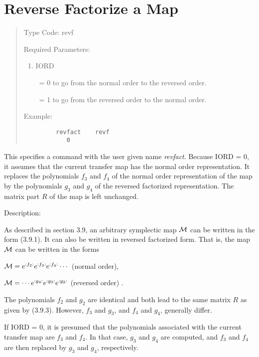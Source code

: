 \section{Reverse Factorize a Map}
\begin{quotation}
\noindent Type Code:  revf 
\vspace{5mm}

\noindent Required Parameters:
\begin{enumerate}
      \item  IORD

             \ = 0 to go from the normal \Mary order to the reversed order.

             \ = 1 to go from the reversed order to the normal \Mary order.
\end{enumerate}

\vspace{5mm}
\noindent Example:
\begin{verbatim}
         revfact    revf
            0
\end{verbatim}
\end{quotation}
This specifies a command with the user given name {\em revfact}.  Because IORD =
0, it assumes that the current transfer map has the normal \Mary order
representation.  It replaces the polynomials $f_3$  and $f_4$  of the normal
\Mary order representation of the map by the polynomials $g_3$  and $g_4$  of the
reversed factorized representation.  The matrix part $R$ of the map is left
unchanged.

\vspace{5mm}
     Description:
\vspace{2mm}

As described in section 3.9, an arbitrary symplectic map ${\cal M}$ can be
written in the form (3.9.1).  It can also be written in reversed
factorized form.  That is, the map ${\cal M}$ can be written in the forms
\begin{center}
${\cal M} = e^{:f_2:} e^{:f_3:} e^{:f_4:} \cdots$ (normal \Mary order),
\end{center}
\begin{center}
${\cal M} = \cdots e^{:g_4:} e^{:g_3:} e^{:g_2:}$ (reversed order) .
\end{center}
The polynomials $f_2$ and $g_2$ are identical and both lead to the same
matrix $R$ as given by (3.9.3).  However, $f_3$ and $g_3$, and $f_4$ and
$g_4$, generally differ.

If IORD = 0, it is presumed that the polynomials associated with the
current transfer map are $f_3$ and $f_4$.  In that case, $g_3$ and $g_4$
are computed, and $f_3$ and $f_4$ are then replaced by $g_3$ and $g_4$,
respectively.

